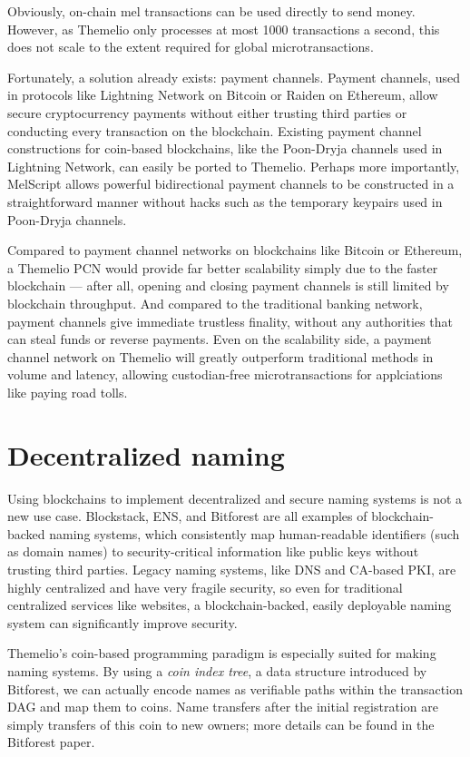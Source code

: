 \documentclass[headinclude]{scrbook}
\begin{document}
Obviously, on-chain mel transactions can be used directly to send money. However, as Themelio only processes at most 1000 transactions a second, this does not scale to the extent required for global microtransactions.

Fortunately, a solution already exists: payment channels. Payment channels, used in protocols like Lightning Network on Bitcoin or Raiden on Ethereum, allow secure cryptocurrency payments without either trusting third parties or conducting every transaction on the blockchain. Existing payment channel constructions for coin-based blockchains, like the Poon-Dryja channels used in Lightning Network, can easily be ported to Themelio. Perhaps more importantly, MelScript allows powerful bidirectional payment channels to be constructed in a straightforward manner without hacks such as the temporary keypairs used in Poon-Dryja channels.

Compared to payment channel networks on blockchains like Bitcoin or Ethereum, a Themelio PCN would provide far better scalability simply due to the faster blockchain --- after all, opening and closing payment channels is still limited by blockchain throughput. And compared to the traditional banking network, payment channels give immediate trustless finality, without any authorities that can steal funds or reverse payments. Even on the scalability side, a payment channel network on Themelio will greatly outperform traditional methods in volume and latency, allowing custodian-free microtransactions for applciations like paying road tolls.

\section{Decentralized naming}

Using blockchains to implement decentralized and secure naming systems is not a new use case. Blockstack, ENS, and Bitforest are all examples of blockchain-backed naming systems, which consistently map human-readable identifiers (such as domain names) to security-critical information like public keys without trusting third parties. Legacy naming systems, like DNS and CA-based PKI, are highly centralized and have very fragile security, so even for traditional centralized services like websites, a blockchain-backed, easily deployable naming system can significantly improve security.

Themelio's coin-based programming paradigm is especially suited for making naming systems. By using a \emph{coin index tree}, a data structure introduced by Bitforest, we can actually encode names as verifiable paths within the transaction DAG and map them to coins. Name transfers after the initial registration are simply transfers of this coin to new owners; more details can be found in the Bitforest paper.
\end{document}
